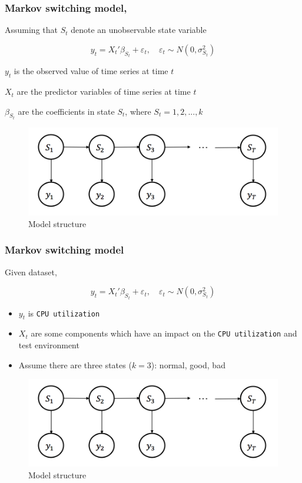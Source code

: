 \documentclass{beamer}
\begin{document}
\begin{frame}
\frametitle{Markov switching model, \cite{p1}}
Assuming that $S_{t}$ denote an unobservable state variable

$$y_{t} = {X_{t}}'\beta_{S_{t}} + \varepsilon_{t}, \quad \varepsilon_{t} \sim N(0,\sigma^{2}_{S_{t}})$$

$y_{t}$ is the observed value of time series at time $t$ 

$X_{t}$ are the predictor variables of time series at time $t$ 

$\beta_{S_{t}}$ are the coefficients in state $S_{t}$, where $S_{t}=1,2,...,k$


\begin{figure}
	\includegraphics[width=0.5\linewidth]{msm}
	\caption{Model structure}
\end{figure}

\end{frame}

\begin{frame}
\frametitle{Markov switching model}

Given dataset,

$$y_{t} = {X_{t}}'\beta_{S_{t}} + \varepsilon_{t}, \quad \varepsilon_{t} \sim N(0,\sigma^{2}_{S_{t}})$$

\begin{itemize}
	\item $y_{t}$ is \texttt{CPU utilization}
	\item$X_{t}$ are some components which have an impact on the \texttt{CPU utilization} and test environment
	\item Assume there are three states ($k=3$): normal, good, bad
\end{itemize}

\begin{figure}
	\includegraphics[width=0.5\linewidth]{msm}
	\caption{Model structure}
\end{figure}

\end{frame}
\end{document}
